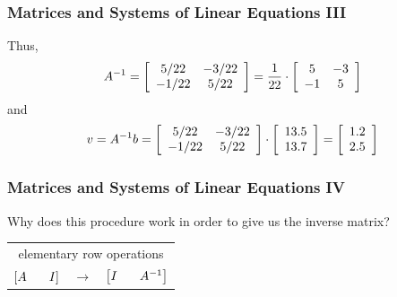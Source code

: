 \documentclass[xcolor=dvipsnames]{beamer}
\begin{document}
\begin{frame}
  \frametitle{Matrices and Systems of Linear Equations III}
Thus,
\begin{equation}
  \label{eq:oogeujie}
  A^{-1}=\left[\begin{array}{cc}
 5/22  & -3/22 \\
 -1/22 & 5/22
               \end{array}\right]=\frac{1}{22}\cdot\left[
               \begin{array}{cc}
                 5 & -3 \\
                 -1 & 5
               \end{array}\right]\notag
\end{equation}
and
\begin{equation}
  \label{eq:seeleeje}
  v=A^{-1}b=\left[\begin{array}{cc}
 5/22  & -3/22 \\
 -1/22 & 5/22
  \end{array}\right]\cdot
\left[\begin{array}{c}
 13.5   \\
 13.7  
  \end{array}\right]=\left[\begin{array}{c}
 1.2   \\
 2.5  
  \end{array}\right]\notag
\end{equation}
\end{frame}


\begin{frame}
  \frametitle{Matrices and Systems of Linear Equations IV}
  Why does this procedure work in order to give us the inverse matrix?
  \begin{tabular}{rcl}
    \multicolumn{3}{c}{elementary row operations} \\
    $\left[A\hspace{0.25in}I\right]$ & $\longrightarrow$ & $\left[I\hspace{0.25in}A^{-1}\right]$ 
  \end{tabular}
\end{frame}
\end{document}
